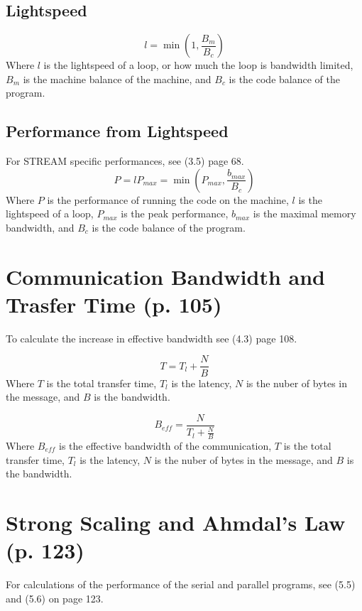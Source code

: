 \documentclass{article}
\begin{document}
		\subsection{Lightspeed}
			\begin{equation}
				l=\min\left(1,\frac{B_m}{B_c}\right)
			\end{equation}
			Where $l$ is the lightspeed of a loop, or how much the loop is bandwidth limited, $B_m$ is the machine balance of the machine, and $B_c$ is the code balance of the program.
		
		\subsection{Performance from Lightspeed}
			For STREAM specific performances, see (3.5) page 68.
			\begin{equation}
				P=lP_{max}=\min\left(P_{max},\frac{b_{max}}{B_c}\right)
			\end{equation}
			Where $P$ is the performance of running the code on the machine, $l$ is the lightspeed of a loop, $P_{max}$ is the peak performance, $b_{max}$ is the maximal memory bandwidth, and $B_c$ is the code balance of the program.
	
	\section{Communication Bandwidth and Trasfer Time (p. 105)}
		To calculate the increase in effective bandwidth see (4.3) page 108.

		\begin{equation}
			T=T_l+\frac{N}{B}
		\end{equation}
		Where $T$ is the total transfer time, $T_l$ is the latency, $N$ is the nuber of bytes in the message, and $B$ is the bandwidth.

		\begin{equation}
			B_{eff}=\frac{N}{T_l+\frac{N}{B}}
		\end{equation}
		Where $B_{eff}$ is the effective bandwidth of the communication, $T$ is the total transfer time, $T_l$ is the latency, $N$ is the nuber of bytes in the message, and $B$ is the bandwidth.

		\newpage
	
	\section{Strong Scaling and Ahmdal's Law (p. 123)}
		For calculations of the performance of the serial and parallel programs, see (5.5) and (5.6) on page 123.
\end{document}
